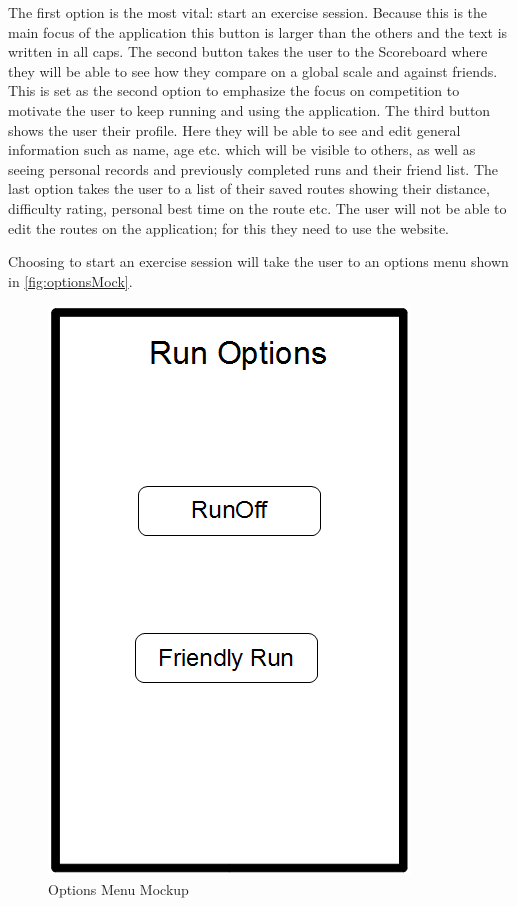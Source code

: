 The first option is the most vital: start an exercise session. Because this is the main focus of the application this button is larger than the others and the text is written in all caps. The second button takes the user to the Scoreboard where they will be able to see how they compare on a global scale and against friends. This is set as the second option to emphasize the focus on competition to motivate the user to keep running and using the application. The third button shows the user their profile. Here they will be able to see and edit general information such as name, age etc. which will be visible to others, as well as seeing personal records and previously completed runs and their friend list. The last option takes the user to a list of their saved routes showing their distance, difficulty rating, personal best time on the route etc. The user will not be able to edit the routes on the application; for this they need to use the website.

Choosing to start an exercise session will take the user to an options menu shown in \autoref{fig:optionsMock}.

\begin{figure}[!ht]
	\begin{center}
		\includegraphics[scale=0.4]{img/optionsMock.png}
		\caption{Options Menu Mockup}
		\label{fig:optionsMock}
	\end{center}
\end{figure}

